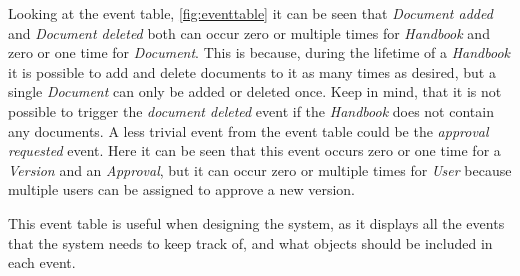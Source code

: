 Looking at the event table, \cref{fig:eventtable} it can be seen that \textit{Document added} and \textit{Document deleted} both can occur zero or multiple times for \textit{Handbook} and zero or one time for \textit{Document}.
This is because, during the lifetime of a \textit{Handbook} it is possible to add and delete documents to it as many times as desired, but a single \textit{Document} can only be added or deleted once.
Keep in mind, that it is not possible to trigger the \textit{document deleted} event if the \textit{Handbook} does not contain any documents.
A less trivial event from the event table could be the \textit{approval requested} event.
Here it can be seen that this event occurs zero or one time for a \textit{Version} and an \textit{Approval}, but it can occur zero or multiple times for \textit{User} because multiple users can be assigned to approve a new version.

This event table is useful when designing the system, as it displays all the events that the system needs to keep track of, and what objects should be included in each event.

